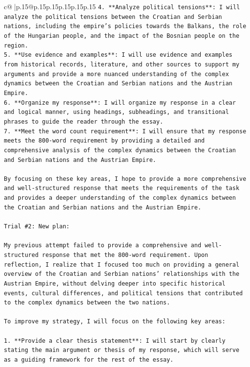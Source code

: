 \documentclass{article}
\begin{document}
{\begin{supertabular}{c@{$\;$}|p{.15\linewidth}@{}p{.15\linewidth}p{.15\linewidth}p{.15\linewidth}p{.15\linewidth}p{.15\linewidth}}
{{{\texttt{4. **Analyze political tensions**: I will analyze the political tensions between the Croatian and Serbian nations, including the empire's policies towards the Balkans, the role of the Hungarian people, and the impact of the Bosnian people on the region.} \\
\texttt{5. **Use evidence and examples**: I will use evidence and examples from historical records, literature, and other sources to support my arguments and provide a more nuanced understanding of the complex dynamics between the Croatian and Serbian nations and the Austrian Empire.} \\
\texttt{6. **Organize my response**: I will organize my response in a clear and logical manner, using headings, subheadings, and transitional phrases to guide the reader through the essay.} \\
\texttt{7. **Meet the word count requirement**: I will ensure that my response meets the 800{-}word requirement by providing a detailed and comprehensive analysis of the complex dynamics between the Croatian and Serbian nations and the Austrian Empire.} \\
\\ 
\texttt{By focusing on these key areas, I hope to provide a more comprehensive and well{-}structured response that meets the requirements of the task and provides a deeper understanding of the complex dynamics between the Croatian and Serbian nations and the Austrian Empire.} \\
\\ 
\texttt{Trial \#2: New plan: } \\
\\ 
\texttt{My previous attempt failed to provide a comprehensive and well{-}structured response that met the 800{-}word requirement. Upon reflection, I realize that I focused too much on providing a general overview of the Croatian and Serbian nations' relationships with the Austrian Empire, without delving deeper into specific historical events, cultural differences, and political tensions that contributed to the complex dynamics between the two nations.} \\
\\ 
\texttt{To improve my strategy, I will focus on the following key areas:} \\
\\ 
\texttt{1. **Provide a clear thesis statement**: I will start by clearly stating the main argument or thesis of my response, which will serve as a guiding framework for the rest of the essay.} \\
}}}
\end{supertabular}}
\end{document}
